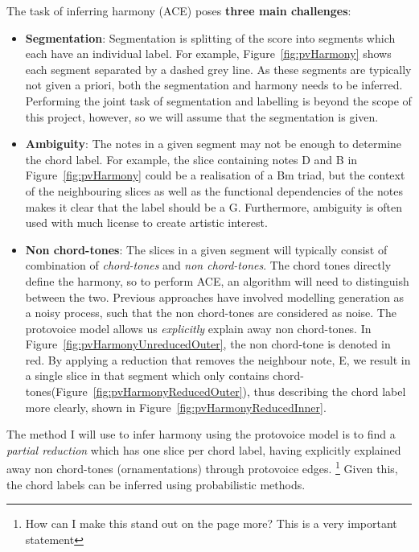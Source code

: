\documentclass[12pt,a4paper,twoside,openright]{report}
\theoremstyle{definition}
\begin{document}
The task of inferring harmony (ACE) poses \textbf{three main challenges}: 
\begin{itemize}
  \item \textbf{Segmentation}: Segmentation is splitting of the score into segments which each have an individual label. For example, Figure~\ref{fig:pvHarmony} shows each segment separated by a dashed grey line. As these segments are typically not given a priori, both the segmentation and harmony needs to be inferred. Performing the joint task of segmentation and labelling is beyond the scope of this project, however, so we will assume that the segmentation is given.
  \item \textbf{Ambiguity}: The notes in a given segment may not be enough to determine the chord label. For example, the slice containing notes D and B in Figure~\ref{fig:pvHarmony} could be a realisation of a Bm triad, but the context of the neighbouring slices as well as the functional dependencies of the notes makes it clear that the label should be a G. Furthermore, ambiguity is often used with much license to create artistic interest.
  \item \textbf{Non chord-tones}: The slices in a given segment will typically consist of combination of \textit{chord-tones} and \textit{non chord-tones}. The chord tones directly define the harmony, so to perform ACE, an algorithm will need to distinguish between the two. Previous approaches have involved modelling generation as a noisy process, such that the non chord-tones are considered as noise\cite{temperleyAlgorithmHarmonicAnalysis1997}. The protovoice model allows us \textit{explicitly} explain away non chord-tones. In Figure~\ref{fig:pvHarmonyUnreducedOuter}, the non chord-tone is denoted in red. By applying a reduction that removes the neighbour note, E, we result in a single slice in that segment which only contains chord-tones(Figure~\ref{fig:pvHarmonyReducedOuter}), thus describing the chord label more clearly, shown in Figure~\ref{fig:pvHarmonyReducedInner}.
\end{itemize}

The method I will use to infer harmony using the protovoice model is to find a \textit{partial reduction} which has one slice per chord label, having explicitly explained away non chord-tones (ornamentations) through protovoice edges. \footnote{How can I make this stand out on the page more? This is a very important statement} Given this, the chord labels can be inferred using probabilistic methods.
\end{document}

